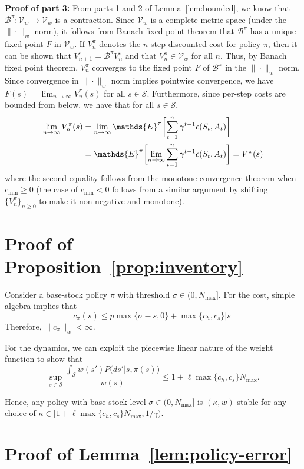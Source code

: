 \documentclass[letterpaper, 10pt]{IEEEtran}
\newcommand*\ALPHABET{\mathcal}
\newcommand*\EXP{\mathds{E}}
\newcommand*\BELLMAN{\mathscr{B}}
\newcommand*\tuple{\kappa, w}
\begin{document}
\textbf{Proof of part 3:} From parts 1 and 2 of Lemma~\ref{lem:bounded}, we know that $\BELLMAN^\pi:\ALPHABET V_w \to \ALPHABET V_w $ is a contraction. Since $\ALPHABET V_w$ is a complete metric space (under the $\|\cdot\|_w$ norm), it follows from Banach fixed point theorem that $\BELLMAN^\pi$ has a unique fixed point $F$ in $\ALPHABET V_w$. If $V^{\pi}_n$ denotes the $n$-step discounted cost for policy $\pi$, then it can be shown that $V^{\pi}_{n+1} = \BELLMAN^\pi V^{\pi}_n$ and that $V^{\pi}_n \in \ALPHABET V_w$ for all $n$. Thus, by Banach fixed point theorem, $V^{\pi}_n$ converges to the fixed point $F$ of $\BELLMAN^\pi$ in the $\|\cdot\|_w$ norm. Since convergence in $\|\cdot\|_w$ norm implies pointwise convergence, we have $F(s) = \lim_{n \to \infty} V^\pi_n(s)$ for all $s \in \ALPHABET S$. Furthermore, since per-step costs are bounded from below, we have that for all $s \in \ALPHABET S$,
\begin{align*}
\lim_{n \to \infty} V^\pi_n(s)
&= 
\lim_{n \to \infty} \EXP^{\pi} \biggl[ \sum_{t=1}^n \gamma^{t-1} c(S_t, A_t) \biggr]
\notag \\
&=
\EXP^{\pi} \biggl[ \lim_{n \to \infty} \sum_{t=1}^n \gamma^{t-1} c(S_t, A_t) \biggr]
= 
V^\pi(s)
\end{align*}
where the second equality follows from the monotone convergence theorem when $c_{\min} \ge 0$ (the case of $c_{\min} < 0$ follows from a similar argument by shifting $\{V^\pi_n\}_{n \ge 0}$ to make it non-negative and monotone).

\section{Proof of Proposition~\ref{prop:inventory}}\label{app:inventory}
Consider a base-stock policy $\pi$ with threshold $\sigma \in (0,N_{\max}]$. For the cost, simple algebra implies that
\[
 c_\pi(s) \le p \max\{ \sigma - s, 0\} + \max\{c_h,c_s\}|s|\label{eq:base_stock_5.1}
\]
Therefore, $\|c_{\pi}\|_w < \infty$.

For the dynamics, we can exploit the piecewise linear nature of the weight function to show that
\[
    \sup_{s \in \ALPHABET S} \frac{\int_{\ALPHABET S} w(s') P\bigl(ds'|s,\pi(s)\bigr) }{w(s)} 
    \leq 1 + \ell \max\{c_h,c_s\}N_{\max}.
\]

Hence, any policy with base-stock level $\sigma \in (0, N_{\max}]$ is $(\tuple)$ stable for any choice of $\kappa \in [1 + \ell \max\{c_h,c_s\} N_{\max}, 1/\gamma)$.

\section{Proof of Lemma~\ref{lem:policy-error}}\label{app:policy-error}
\end{document}
